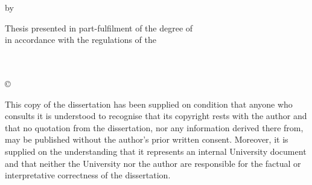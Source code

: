 \thispagestyle{empty}
\vskip 3cm
\begin{center}
    {\Huge\bfseries\sf \mytitle \par}
    \vskip 1cm
    \sf by
    \vskip 1cm
    \large \sf \authorname \\
    \sf \authornumber
\end{center}

\begin{center}
	\large \sf Thesis presented in part-fulfilment of the degree of \degname \\ in accordance with the regulations of the \univname
\end{center}

\vskip 5cm

\begin{minipage}{0.4\textwidth}
\begin{flushleft} 
\large \sf 
\depname \\
\univname \\
\univaddr
\vskip 0.5cm
\copyright~\mydate~\authorname
\end{flushleft}
\end{minipage}


\begin{minipage}{\textwidth}
\begin{flushleft}
\sf This copy of the dissertation has been supplied on condition that anyone who consults it is understood to recognise that its copyright rests with the author and that no quotation from the dissertation, nor any information derived there from, may be published without the author's prior written consent. Moreover, it is supplied on the understanding that it represents an internal University document and that neither the University nor the author are responsible for the factual or interpretative correctness of the dissertation.
\end{flushleft}
\end{minipage}

\vfill

\newpage